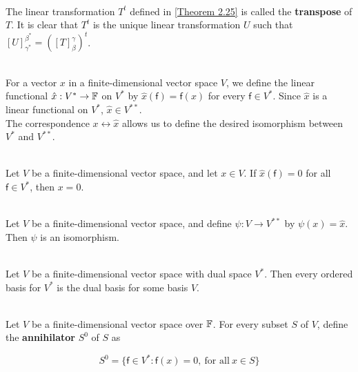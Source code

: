 \begin{definition}
	\hfill\\
	The linear transformation $T^t$ defined in \autoref{Theorem 2.25} is called the \textbf{transpose} of $T$. It is clear that $T^t$ is the unique linear transformation $U$ such that $[U]_{\gamma^*}^{\beta^*} = ([T]_\beta^\gamma)^t$.
\end{definition}

\begin{definition}
	\hfill\\
	For a vector $x$ in a finite-dimensional vector space $V$, we define the linear functional $\hat{x}: V^* \to \mathbb{F}$ on $V^*$ by $\hat{x}(\mathsf{f}) = \mathsf{f}(x)$ for every $\mathsf{f} \in V^*$. Since $\hat{x}$ is a linear functional on $V^*$, $\hat{x} \in V^{**}$.\\

	The correspondence $x \leftrightarrow \hat{x}$ allows us to define the desired isomorphism between $V^*$ and $V^{**}$.
\end{definition}

\begin{lemma}
	\hfill\\
	Let $V$ be a finite-dimensional vector space, and let $x \in V$. If $\hat{x}(\mathsf{f})=0$ for all $\mathsf{f} \in V^*$, then $x = 0$.
\end{lemma}

\begin{theorem}\label{Theorem 2.26}
	\hfill\\
	Let $V$ be a finite-dimensional vector space, and define $\psi: V \to V^{**}$ by $\psi(x) = \hat{x}$. Then $\psi$ is an isomorphism.
\end{theorem}

\begin{corollary}
	\hfill\\
	Let $V$ be a finite-dimensional vector space with dual space $V^*$. Then every ordered basis for $V^*$ is the dual basis for some basis $V$.
\end{corollary}

\begin{definition}
	\hfill\\
	Let $V$ be a finite-dimensional vector space over $\mathbb{F}$. For every subset $S$ of $V$, define the \textbf{annihilator} $S^0$ of $S$ as

	\[S^0 = \{\mathsf{f} \in V^* : \mathsf{f}(x) = 0,\ \text{for all}\ x \in S\}\]
\end{definition}
